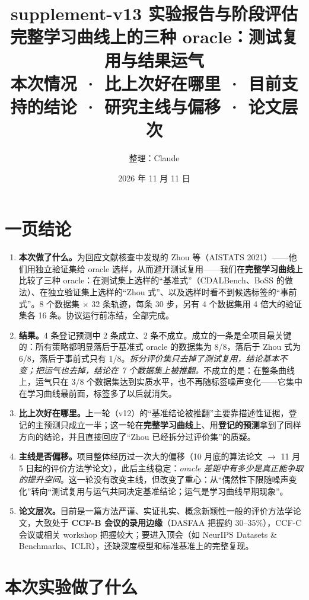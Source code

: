 \documentclass[11pt,a4paper]{article}
\title{\textbf{supplement-v13 实验报告与阶段评估}\\[4pt]
\large 完整学习曲线上的三种 oracle：测试复用与结果运气\\[2pt]
\normalsize 本次情况 · 比上次好在哪里 · 目前支持的结论 · 研究主线与偏移 · 论文层次}
\author{整理：Claude}
\date{2026 年 11 月 11 日}
\begin{document}
\maketitle

\section*{一页结论}
\begin{enumerate}
\item \textbf{本次做了什么。}为回应文献核查中发现的 Zhou 等（AISTATS 2021）——他们用独立验证集给 oracle 选样，从而避开测试复用——我们在\textbf{完整学习曲线}上比较了三种 oracle：在测试集上选样的“基准式”（CDALBench、BoSS 的做法）、在独立验证集上选样的“Zhou 式”、以及选样时看不到候选标签的“事前式”。8 个数据集 $\times$ 32 条轨迹，每条 30 步，另有 4 个数据集用 4 倍大的验证集各 16 条。协议运行前冻结，全部完成。
\item \textbf{结果。}4 条登记预测中 2 条成立、2 条不成立。成立的一条是全项目最关键的：所有策略都明显落后于基准式 oracle 的数据集为 8/8，落后于 Zhou 式为 6/8，落后于事前式只有 1/8。\emph{拆分评价集只去掉了测试复用，结论基本不变；把运气也去掉，结论在 7 个数据集上被推翻。}不成立的是：在整条曲线上，运气只在 3/8 个数据集达到实质水平，也不再随标签噪声变化——它集中在学习曲线最前面，标签多了以后就消失。
\item \textbf{比上次好在哪里。}上一轮（v12）的“基准结论被推翻”主要靠描述性证据，登记的主预测只成立一半；这一轮在\textbf{完整学习曲线}上、用\textbf{登记的预测}拿到了同样方向的结论，并且直接回应了“Zhou 已经拆分过评价集”的质疑。
\item \textbf{主线是否偏移。}项目整体经历过一次大的偏移（10 月底的算法论文 $\to$ 11 月 5 日起的评价方法学论文），此后主线稳定：\emph{oracle 差距中有多少是真正能争取的提升空间}。这一轮没有改变主线，但改变了重心：从“偶然性下限随噪声变化”转向“测试复用与运气共同决定基准结论；运气是学习曲线早期现象”。
\item \textbf{论文层次。}目前是一篇方法严谨、实证扎实、概念新颖性一般的评价方法学论文，大致处于 \textbf{CCF-B 会议的录用边缘}（DASFAA 把握约 30--35\%），CCF-C 会议或相关 workshop 把握较大；要进入顶会（如 NeurIPS Datasets \& Benchmarks、ICLR），还缺深度模型和标准基准上的完整复现。
\end{enumerate}

\tableofcontents
\newpage

\section{本次实验做了什么}
\end{document}
